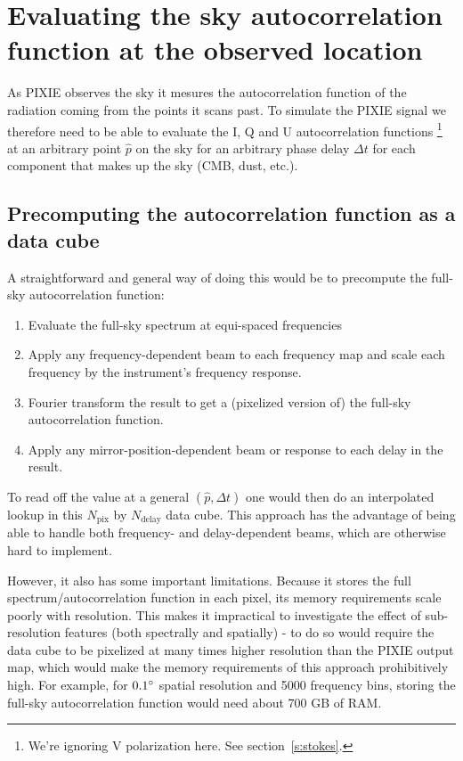 \documentclass{article}
\begin{document}

\section{Evaluating the sky autocorrelation function at the observed location}
As PIXIE observes the sky it mesures the autocorrelation function of the
radiation coming from the points it scans past. To simulate the PIXIE signal
we therefore need to be able to evaluate the I, Q and U autocorrelation
functions
\footnote{We're ignoring V polarization here. See section~\ref{s:stokes}.}
at an arbitrary point $\hat p$ on the sky for an arbitrary phase
delay $\Delta t$ for each component that makes up the sky (CMB, dust, etc.).

\subsection{Precomputing the autocorrelation function as a data cube}
\label{s:autocorr-problems}
A straightforward and general way of doing this would be to precompute the
full-sky autocorrelation function:
\begin{enumerate}
	\item Evaluate the full-sky spectrum at equi-spaced
frequencies
	\item Apply any frequency-dependent beam to each frequency map and
scale each frequency by the instrument's frequency response.
	\item Fourier transform the result to get a (pixelized version of)
		the full-sky autocorrelation function.
	\item Apply any mirror-position-dependent beam or response to
		each delay in the result.
\end{enumerate}
To read off the value at a general $(\hat p, \Delta t)$ one would then do
an interpolated lookup in this $N_\textrm{pix}$ by $N_\textrm{delay}$ data
cube. This approach has the advantage of being able to handle both frequency-
and delay-dependent beams, which are otherwise hard to implement.

However, it also has some important limitations. Because it stores the full
spectrum/autocorrelation function in each pixel, its memory requirements
scale poorly with resolution. This makes it impractical to investigate the effect
of sub-resolution features (both spectrally and spatially) - to do so would
require the data cube to be pixelized at many times higher resolution
than the PIXIE output map, which would make the memory requirements of this approach
prohibitively high. For example,
for $0.1\degree$ spatial resolution and 5000 frequency bins, storing the full-sky
autocorrelation function would need about 700 GB of RAM.
\end{document}
